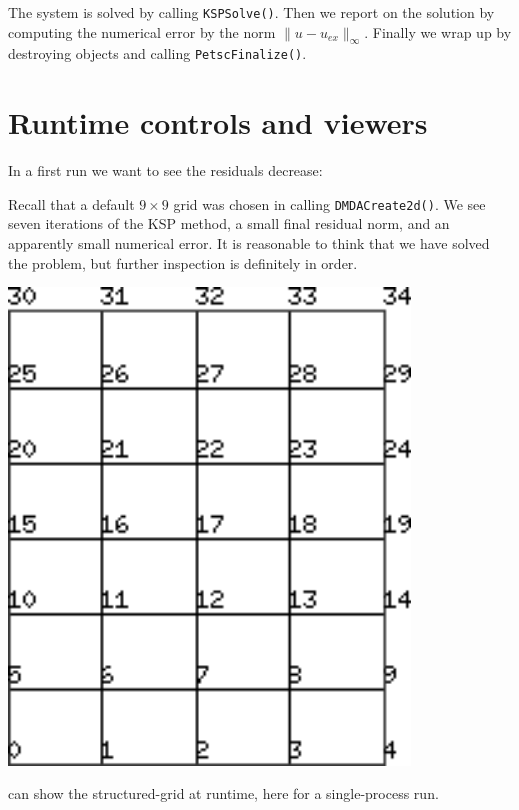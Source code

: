 The system is solved by calling \texttt{KSPSolve()}.  Then we report on the solution by computing the numerical error by the norm $\|u-u_{ex}\|_\infty$.  Finally we wrap up by destroying objects and calling \texttt{PetscFinalize()}.



\section{Runtime controls and viewers}

In a first run we want to see the residuals decrease:
Recall that a default $9$ grid was chosen in calling \texttt{DMDACreate2d()}.  We see seven iterations of the KSP method, a small final residual norm, and an apparently small numerical error.  It is reasonable to think that we have solved the problem, but further inspection is definitely in order.

\begin{marginfigure}
\bigskip
\includegraphics[width=0.8\textwidth]{figs/dmM5N7}
\caption{\PETSc can show the structured-grid \pDMDA at runtime, here for a single-process run.}
\label{fig:dmM5N7}
\end{marginfigure}

